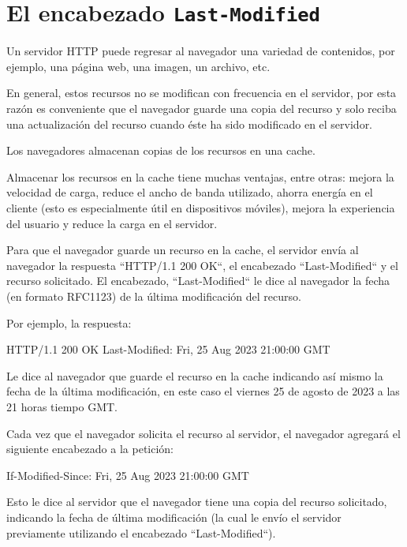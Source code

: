 \section{El encabezado \texttt{Last-Modified}}

Un servidor HTTP puede regresar al navegador una variedad de contenidos, por ejemplo, una página web, una imagen, un archivo, etc.

En general, estos recursos no se modifican con frecuencia en el servidor, por esta razón es conveniente que el navegador guarde una copia del recurso y solo reciba una actualización del recurso cuando éste ha sido modificado en el servidor.

Los navegadores almacenan copias de los recursos en una cache.

Almacenar los recursos en la cache tiene muchas ventajas, entre otras: mejora la velocidad de carga, reduce el ancho de banda utilizado, ahorra energía en el cliente (esto es especialmente útil en dispositivos móviles), mejora la experiencia del usuario y reduce la carga en el servidor.

Para que el navegador guarde un recurso en la cache, el servidor envía al navegador la respuesta ``HTTP/1.1 200 OK``, el encabezado ``Last-Modified`` y el recurso solicitado. El encabezado, ``Last-Modified`` le dice al navegador la fecha (en formato RFC1123) de la última modificación del recurso.

Por ejemplo, la respuesta:

\begin{SourceCode}
HTTP/1.1 200 OK
Last-Modified:  Fri, 25 Aug 2023 21:00:00 GMT
\end{SourceCode}

Le dice al navegador que guarde el recurso en la cache indicando así mismo la fecha de la última modificación, en este caso el viernes 25 de agosto de 2023 a las 21 horas tiempo GMT.

Cada vez que el navegador solicita el recurso al servidor, el navegador agregará el siguiente encabezado a la petición:

\begin{SourceCode}
If-Modified-Since: Fri, 25 Aug 2023 21:00:00 GMT
\end{SourceCode}

Esto le dice al servidor que el navegador tiene una copia del recurso solicitado, indicando la fecha de última modificación (la cual le envío el servidor previamente utilizando el encabezado ``Last-Modified``).

